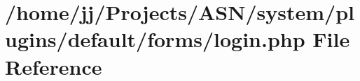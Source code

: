 \hypertarget{system_2plugins_2default_2forms_2login_8php}{}\section{/home/jj/\+Projects/\+A\+S\+N/system/plugins/default/forms/login.php File Reference}
\label{system_2plugins_2default_2forms_2login_8php}
